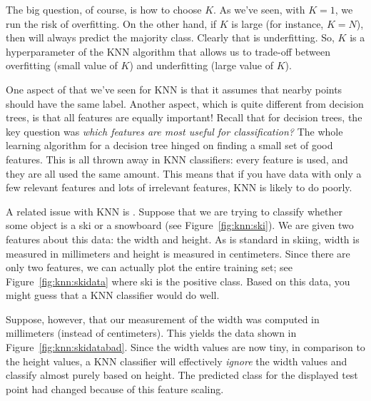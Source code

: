 The big question, of course, is how to choose $K$.  As we've seen,
with $K=1$, we run the risk of overfitting.  On the other hand, if $K$
is large (for instance, $K=N$), then  will always
predict the majority class.  Clearly that is underfitting.  So, $K$ is
a hyperparameter of the KNN algorithm that allows us to trade-off
between overfitting (small value of $K$) and underfitting (large value
of $K$).


One aspect of  that we've seen for KNN is that
it assumes that nearby points should have the same label.  Another
aspect, which is quite different from decision trees, is that all
features are equally important!  Recall that for decision trees, the
key question was \emph{which features are most useful for
  classification?}  The whole learning algorithm for a decision tree
hinged on finding a small set of good features.  This is all thrown
away in KNN classifiers: every feature is used, and they are all used
the same amount.  This means that if you have data with only a few
relevant features and lots of irrelevant features, KNN is likely to do
poorly.

\MoveNextFigure{-18cm}

\MoveNextFigure{-10cm}

A related issue with KNN is .  Suppose that we
are trying to classify whether some object is a ski or a snowboard
(see Figure~\ref{fig:knn:ski}).  We are given two features about this
data: the width and height.  As is standard in skiing, width is
measured in millimeters and height is measured in centimeters.  Since
there are only two features, we can actually plot the entire training
set; see Figure~\ref{fig:knn:skidata} where ski is the positive class.
Based on this data, you might guess that a KNN classifier would do
well.

Suppose, however, that our measurement of the width was computed in
millimeters (instead of centimeters).  This yields the data shown in
Figure~\ref{fig:knn:skidatabad}.  Since the width values are now tiny,
in comparison to the height values, a KNN classifier will effectively
\emph{ignore} the width values and classify almost purely based on
height.  The predicted class for the displayed test point had changed
because of this feature scaling.

